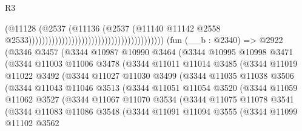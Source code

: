 \begin{lexlean}{R3}
\begin{coremodule}
                                                                            (@11128
                                                                              (@2537
                                                                                (@11136
                                                                                  (@2537
                                                                                    (@11140
                                                                                      @11142
                                                                                      @2558
                                                                                      @2533)))))))))))))))))))))))))))))))))))))))))
    (fun (__b : @2340) =>
    @2922
      (@3346
        @3457
        (@3344
          @10987
          @10990
          @3464
          (@3344
            @10995
            @10998
            @3471
            (@3344
              @11003
              @11006
              @3478
              (@3344
                @11011
                @11014
                @3485
                (@3344
                  @11019
                  @11022
                  @3492
                  (@3344
                    @11027
                    @11030
                    @3499
                    (@3344
                      @11035
                      @11038
                      @3506
                      (@3344
                        @11043
                        @11046
                        @3513
                        (@3344
                          @11051
                          @11054
                          @3520
                          (@3344
                            @11059
                            @11062
                            @3527
                            (@3344
                              @11067
                              @11070
                              @3534
                              (@3344
                                @11075
                                @11078
                                @3541
                                (@3344
                                  @11083
                                  @11086
                                  @3548
                                  (@3344
                                    @11091
                                    @11094
                                    @3555
                                    (@3344
                                      @11099
                                      @11102
                                      @3562

\end{coremodule}
\end{lexlean}
